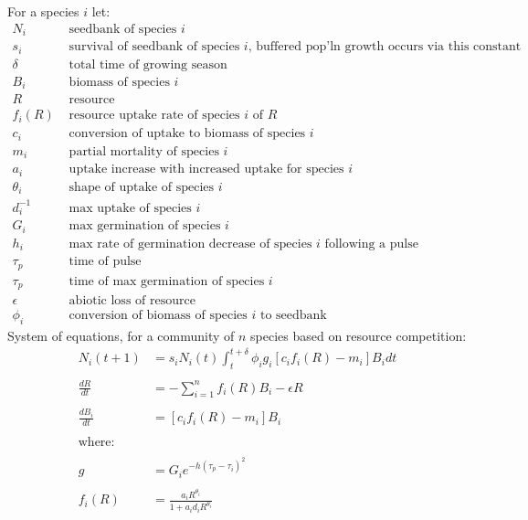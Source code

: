 \documentclass[11pt,a4paper,oneside]{article}
\begin{document}
\noindent For a species \(i\) let:
\begin{align*}
N_{i} & \text{   seedbank of species } i
\\
s_{i} & \text{   survival of seedbank of species } i \text{, buffered pop'ln
  growth occurs via this constant}
\\
\delta & \text{   total time of growing season}
\\
B_{i} &  \text{   biomass of species } i
\\
R &   \text{   resource}
\\
f_{i}(R) & \text{  resource uptake rate of species } i \text{ of } R
\\
c_{i} & \text{   conversion of uptake to biomass of species } i
\\
m_{i} & \text{   partial mortality of species } i
\\
a_{i} & \text{   uptake increase with increased uptake for species } i
\\
\theta_{i} & \text{   shape of uptake of species } i
\\
d_{i}^{-1} & \text{   max uptake of species } i
\\
G_{i} & \text{   max germination of species } i
\\
h_{i} & \text{   max rate of germination decrease of species } i
\text{ following a pulse}
\\
\tau_{p} & \text{   time of pulse }
\\
\tau_{p} & \text{   time of max germination of species } i
\\
\epsilon & \text{   abiotic loss of resource}
\\
\phi_{i} & \text{   conversion of biomass of species } i \text{ to seedbank}
\end{align*}
\newpage
\noindent System of equations, for a community of \(n\) species based
on resource competition:
\begin{align*}
N_{i}(t+1)& = s_{i}N_{i}(t)\int_t^{t+\delta}\phi_{i}g_{i}[c_{i}f_{i}(R) -
m_{i}]B_{i}dt
\\
\\
\frac{dR}{dt} & = - \sum_{i=1}^{n}f_{i}(R)B_{i} -\epsilon R
\\
\\
\frac{dB_{i}}{dt} &  = [c_{i}f_{i}(R) - m_{i}]B_{i}
\\
\\
\text{where:} 
\\
\\
g & = G_{i}e^{-h(\tau_{p}-\tau_{i})^2}
\\
\\
f_{i}(R) & = \frac{a_{i}R^{\theta_{i}}}{1+a_{i}d_{i}R^{\theta_{i}}}
\\
\end{align*}
\end{document}
